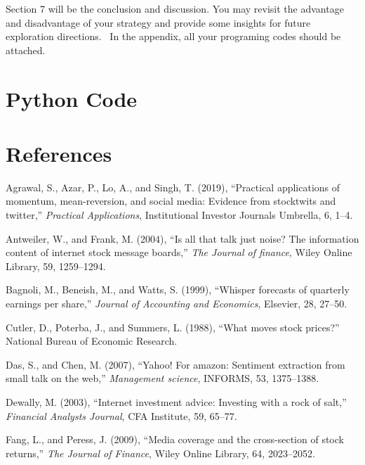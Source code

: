\documentclass[11,]{article}
\begin{document}
Section 7 will be the conclusion and discussion. You may revisit the
advantage and disadvantage of your strategy and provide some insights
for future exploration directions.~ In the appendix, all your programing
codes should be attached.~

\hypertarget{python-code}{%
\section{Python Code}\label{python-code}}

\hypertarget{references}{%
\section*{References}\label{references}}

\hypertarget{refs}{}
\leavevmode\hypertarget{ref-agrawal2019}{}%
Agrawal, S., Azar, P., Lo, A., and Singh, T. (2019), ``Practical
applications of momentum, mean-reversion, and social media: Evidence
from stocktwits and twitter,'' \emph{Practical Applications},
Institutional Investor Journals Umbrella, 6, 1--4.

\leavevmode\hypertarget{ref-antweiler2004}{}%
Antweiler, W., and Frank, M. (2004), ``Is all that talk just noise? The
information content of internet stock message boards,'' \emph{The
Journal of finance}, Wiley Online Library, 59, 1259--1294.

\leavevmode\hypertarget{ref-bagnoli1999}{}%
Bagnoli, M., Beneish, M., and Watts, S. (1999), ``Whisper forecasts of
quarterly earnings per share,'' \emph{Journal of Accounting and
Economics}, Elsevier, 28, 27--50.

\leavevmode\hypertarget{ref-cutler1988}{}%
Cutler, D., Poterba, J., and Summers, L. (1988), ``What moves stock
prices?'' National Bureau of Economic Research.

\leavevmode\hypertarget{ref-das2007}{}%
Das, S., and Chen, M. (2007), ``Yahoo! For amazon: Sentiment extraction
from small talk on the web,'' \emph{Management science}, INFORMS, 53,
1375--1388.

\leavevmode\hypertarget{ref-dewally2003}{}%
Dewally, M. (2003), ``Internet investment advice: Investing with a rock
of salt,'' \emph{Financial Analysts Journal}, CFA Institute, 59, 65--77.

\leavevmode\hypertarget{ref-fang2009}{}%
Fang, L., and Peress, J. (2009), ``Media coverage and the cross-section
of stock returns,'' \emph{The Journal of Finance}, Wiley Online Library,
64, 2023--2052.
\end{document}

